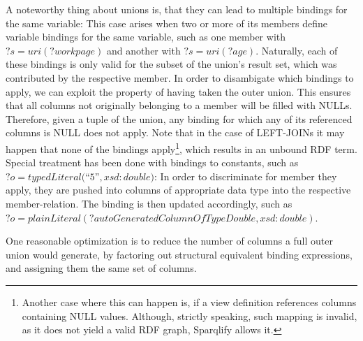 \documentclass[a4paper,twoside,bibtotoc,abstracton,12pt,BCOR=15mm]{scrreprt}
\newcommand{\todo}[1]{\textbf{ToDo: \textit{#1}}}
\begin{document}
A noteworthy thing about unions is, that they can lead to multiple bindings for the same variable:
This case arises when two or more of its members define variable bindings for the same variable, such as one member with $?s = uri(?workpage)$ and another with $?s = uri(?age)$.
Naturally, each of these bindings is only valid for the subset of the union's result set, which was contributed by the respective member.
In order to disambigate which bindings to apply, we can exploit the property of having taken the outer union. This ensures that all columns not originally belonging to a member will be filled with NULLs.
Therefore, given a tuple of the union, any binding for which any of its referenced columns is NULL does not apply. Note that in the case of LEFT-JOINs it may happen that none of the bindings
apply\footnote{Another case where this can happen is, if a view definition references columns containing NULL values. Although, strictly speaking, such mapping is invalid, as it does not yield a valid RDF graph, Sparqlify allows it.}, which
results in an unbound RDF term.
Special treatment has been done with bindings to constants, such as $?o = typedLiteral($``$5$''$, xsd:double)$: In order to discriminate for member they apply,
they are pushed into columns of appropriate data type into the respective member-relation. The binding is then updated accordingly, such as $?o = plainLiteral(?autoGeneratedColumnOfTypeDouble, xsd:double)$.


One reasonable optimization is to reduce the number of columns a full outer union would generate, by factoring out structural equivalent binding expressions, and assigning them the same set of columns.


\end{document}
